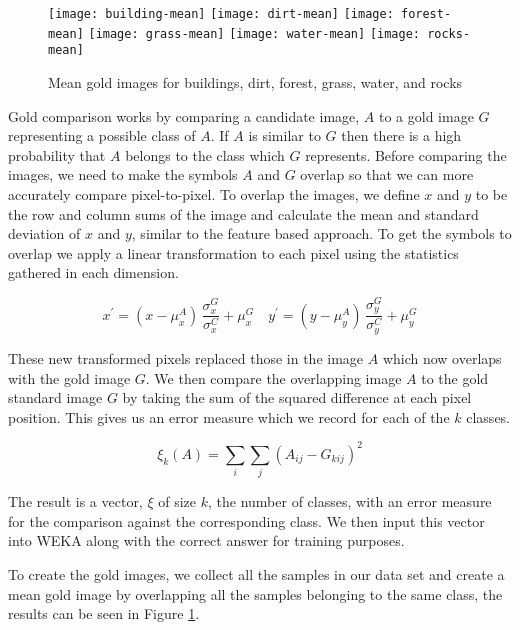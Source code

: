 
\begin{figure}[h]
\texttt{[image: building-mean]}
\texttt{[image: dirt-mean]}
\texttt{[image: forest-mean]}
\texttt{[image: grass-mean]}
\texttt{[image: water-mean]}
\texttt{[image: rocks-mean]}
\caption{Mean gold images for buildings, dirt, forest, grass, water, and rocks}
\label{figure:means}
\end{figure}


Gold comparison works by comparing a candidate image, $A$ to a gold image $G$
representing a possible class of $A$. If $A$ is similar to $G$ then there is a
high probability that $A$ belongs to the class which $G$ represents. Before
comparing the images, we need to make the symbols $A$ and $G$ overlap so that
we can more accurately compare pixel-to-pixel.  To overlap the images, we
define $x$ and $y$ to be the row and column sums of the image and calculate the
mean and standard deviation of $x$ and $y$, similar to the feature based
approach. To get the symbols to overlap we apply a linear transformation to
each pixel using the statistics gathered in each dimension.

\begin{equation} \label{eq:gold}
x^{\prime} = (x - \mu^{A}_{x}) \, \frac{\sigma^{G}_{x}}{\sigma^{C}_{x}} + \mu^{G}_{x} \quad
y^{\prime} = (y - \mu^{A}_{y}) \, \frac{\sigma^{G}_{y}}{\sigma^{C}_{y}} + \mu^{G}_{y}
\end{equation}

These new transformed pixels replaced those in the image $A$ which now overlaps
with the gold image $G$. We then compare the overlapping image $A$ to the gold
standard image $G$ by taking the sum of the squared difference at each pixel
position. This gives us an error measure which we record for each of the $k$
classes.

\[ \xi_{k}(A) = \sum_{i}\sum_{j}{(A_{ij} - G_{kij})^{2}} \]

The result is a vector, $\xi$ of size $k$, the number of classes, with an error
measure for the comparison against the corresponding class. We then input this
vector into WEKA along with the correct answer for training purposes.

To create the gold images, we collect all the samples in our data set and
create a mean gold image by overlapping all the samples belonging to the same
class, the results can be seen in Figure \ref{figure:means}.
